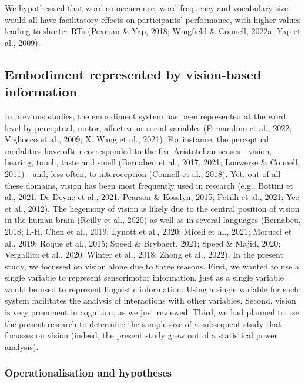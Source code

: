 \documentclass[
  12pt,
  man,floatsintext]{apa7}
\begin{document}
We hypothesised that word co-occurrence, word frequency and vocabulary size would all have facilitatory effects on participants' performance, with higher values leading to shorter RTs (Pexman \& Yap, 2018; Wingfield \& Connell, 2022a; Yap et al., 2009).

\hypertarget{embodiment-represented-by-vision-based-information}{%
\subsection{Embodiment represented by vision-based information}\label{embodiment-represented-by-vision-based-information}}

In previous studies, the embodiment system has been represented at the word level by perceptual, motor, affective or social variables (Fernandino et al., 2022; Vigliocco et al., 2009; X. Wang et al., 2021). For instance, the perceptual modalities have often corresponded to the five Aristotelian senses---vision, hearing, touch, taste and smell (Bernabeu et al., 2017, 2021; Louwerse \& Connell, 2011)---and, less often, to interoception (Connell et al., 2018). Yet, out of all these domains, vision has been most frequently used in research (e.g., Bottini et al., 2021; De Deyne et al., 2021; Pearson \& Kosslyn, 2015; Petilli et al., 2021; Yee et al., 2012). The hegemony of vision is likely due to the central position of vision in the human brain (Reilly et al., 2020) as well as in several languages (Bernabeu, 2018; I.-H. Chen et al., 2019; Lynott et al., 2020; Miceli et al., 2021; Morucci et al., 2019; Roque et al., 2015; Speed \& Brybaert, 2021; Speed \& Majid, 2020; Vergallito et al., 2020; Winter et al., 2018; Zhong et al., 2022). In the present study, we focussed on vision alone due to three reasons. First, we wanted to use a single variable to represent sensorimotor information, just as a single variable would be used to represent linguistic information. Using a single variable for each system facilitates the analysis of interactions with other variables. Second, vision is very prominent in cognition, as we just reviewed. Third, we had planned to use the present research to determine the sample size of a subsequent study that focusses on vision (indeed, the present study grew out of a statistical power analysis).

\hypertarget{operationalisation-and-hypotheses-1}{%
\subsubsection{Operationalisation and hypotheses}\label{operationalisation-and-hypotheses-1}}
\end{document}
